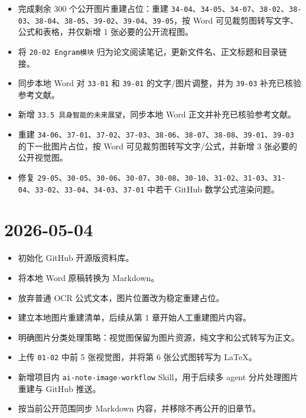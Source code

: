 \begin{itemize}
\tightlist
\item
  完成剩余 300 个公开图片重建占位：重建 \texttt{34-04}、\texttt{34-05}、\texttt{34-07}、\texttt{38-02}、\texttt{38-03}、\texttt{38-04}、\texttt{38-05}、\texttt{39-02}、\texttt{39-04}、\texttt{39-05}，按 Word 可见裁剪图转写文字、公式和表格，并仅新增 1 张必要的公开流程图。
\item
  将 \texttt{20-02\ Engram模块} 归为论文阅读笔记，更新文件名、正文标题和目录链接。
\item
  同步本地 Word 对 \texttt{33-01} 和 \texttt{39-01} 的文字/图片调整，并为 \texttt{39-03} 补充已核验参考文献。
\item
  新增 \texttt{33.5\ 具身智能的未来展望}，同步本地 Word 正文并补充已核验参考文献。
\item
  重建 \texttt{34-06}、\texttt{37-01}、\texttt{37-02}、\texttt{37-03}、\texttt{38-06}、\texttt{38-07}、\texttt{38-08}、\texttt{39-01}、\texttt{39-03} 的下一批图片占位，按 Word 可见裁剪图转写文字/公式，并新增 3 张必要的公开视觉图。
\item
  修复 \texttt{29-05}、\texttt{30-05}、\texttt{30-06}、\texttt{30-07}、\texttt{30-08}、\texttt{30-10}、\texttt{31-02}、\texttt{31-03}、\texttt{31-04}、\texttt{33-02}、\texttt{33-04}、\texttt{34-03}、\texttt{37-01} 中若干 GitHub 数学公式渲染问题。
\end{itemize}

\hypertarget{section-6}{%
\section{2026-05-04}\label{section-6}}

\begin{itemize}
\tightlist
\item
  初始化 GitHub 开源版资料库。
\item
  将本地 Word 原稿转换为 Markdown。
\item
  放弃普通 OCR 公式文本，图片位置改为稳定重建占位。
\item
  建立本地图片重建清单，后续从第 1 章开始人工重建图片内容。
\item
  明确图片分类处理策略：视觉图保留为图片资源，纯文字和公式转写为正文。
\item
  上传 \texttt{01-02} 中前 5 张视觉图，并将第 6 张公式图转写为 LaTeX。
\item
  新增项目内 \texttt{ai-note-image-workflow} Skill，用于后续多 agent 分片处理图片重建与 GitHub 推送。
\item
  按当前公开范围同步 Markdown 内容，并移除不再公开的旧章节。
\end{itemize}

\clearpage
